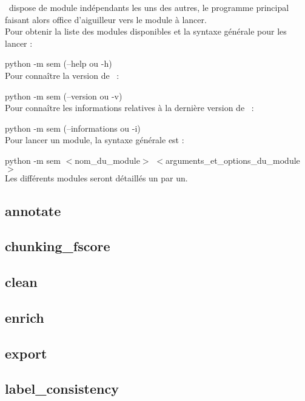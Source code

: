 \documentclass[manual-fr.tex]{subfiles}
\begin{document}
\SEM\ dispose de module indépendants les uns des autres, le programme principal faisant alors office d'aiguilleur vers le module à lancer.\\

Pour obtenir la liste des modules disponibles et la syntaxe générale pour les lancer :

python -m sem (--help ou -h)\\

Pour connaître la version de \SEM\ :

python -m sem (--version ou -v)\\

Pour connaître les informations relatives à la dernière version de \SEM\ :

python -m sem (--informations ou -i)\\

Pour lancer un module, la syntaxe générale est :

python -m sem $<$nom\_du\_module$>$ $<$arguments\_et\_options\_du\_module$>$\\

Les différents modules seront détaillés un par un.

\subsection{annotate}


\subsection{chunking\_fscore}


\subsection{clean}


\subsection{enrich}


\subsection{export}


\subsection{label\_consistency}

\end{document}
